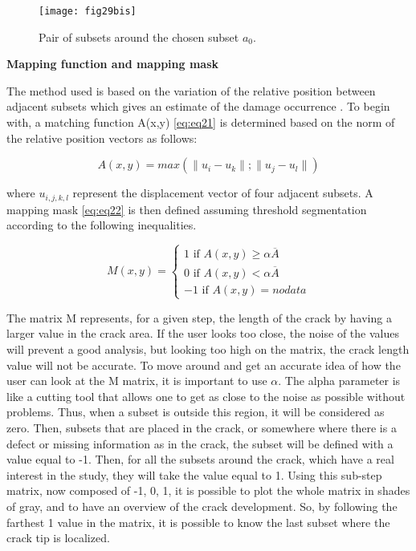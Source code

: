 \begin{figure}[htp]
	\centering
	\texttt{[image: fig29bis]}
	\caption{Pair of subsets around the chosen subset $a_0$.}
	\label{fig:fig29bis}
\end{figure}

\textbf{Mapping function and mapping mask}

The method used is based on the variation of the relative position between adjacent subsets which gives an estimate of the damage occurrence \citep{Xavieretal2014}. To begin with, a matching function A(x,y) \ref{eq:eq21} is determined based on the norm of the relative position vectors as follows:

\begin{equation}
	A(x,y)=max(\lVert u_i-u_k\rVert;\lVert u_j-u_l\rVert)
	\label{eq:eq21}
\end{equation}

where $u_{i,j,k,l}$ represent the displacement vector of four adjacent subsets. A mapping mask \ref{eq:eq22} is then defined assuming threshold segmentation according to the following inequalities.

\begin{equation}
	M(x,y)=
	\begin{cases}
		1 \text{ if } A(x,y) \geq \alpha \overline{A} \\
		0 \text{ if } A(x,y)< \alpha \overline{A}\\
		-1 \text{ if } A(x,y)= no data 
	\end{cases}
	\label{eq:eq22}
\end{equation}

The matrix M represents, for a given step, the length of the crack by having a larger value in the crack area. If the user looks too close, the noise of the values will prevent a good analysis, but looking too high on the matrix, the crack length value will not be accurate. To move around and get an accurate idea of how the user can look at the M matrix, it is important to use $\alpha$. The alpha parameter is like a cutting tool that allows one to get as close to the noise as possible without problems. Thus, when a subset is outside this region, it will be considered as zero. Then, subsets that are placed in the crack, or somewhere where there is a defect or missing information as in the crack, the subset will be defined with a value equal to -1. Then, for all the subsets around the crack, which have a real interest in the study, they will take the value equal to 1. Using this sub-step matrix, now composed of -1, 0, 1, it is possible to plot the whole matrix in shades of gray, and to have an overview of the crack development. So, by following the farthest 1 value in the matrix, it is possible to know the last subset where the crack tip is localized.


